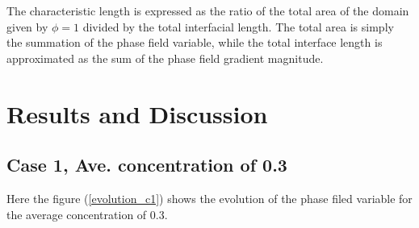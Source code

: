 \documentclass[a4paper,6pt]{article}
\begin{document}
The characteristic length is expressed as the ratio of the total area of the domain given by $\phi=1$ divided by the total interfacial length. The total area is simply the summation of the phase field variable, while the total interface length is approximated as the sum of the phase field gradient magnitude.

\section{Results and Discussion}
\subsection{Case 1, Ave. concentration of 0.3}

Here the figure (\ref{evolution_c1}) shows the evolution of the phase filed variable for the average concentration of 0.3.
\end{document}
